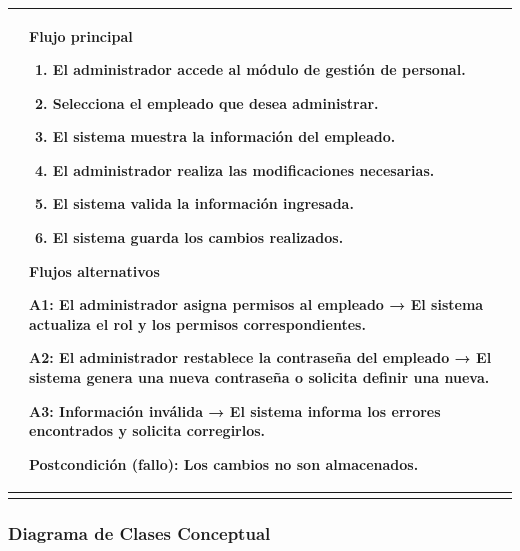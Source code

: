 \documentclass[
]{article}
\newcounter{none} %
\begin{document}
{\def\LTcaptype{none} %
\begin{longtable}[]{@{}
  >{\raggedright\arraybackslash}p{}
  >{\raggedright\arraybackslash}p{}@{}}
\toprule\noalign{}
\begin{minipage}[b]{\linewidth}\raggedright
\end{minipage} & \begin{minipage}[b]{\linewidth}\raggedright
\textbf{Flujo principal}

\begin{enumerate}
\def\labelenumi{\arabic{enumi}.}
\item
  El administrador accede al módulo de gestión de personal.
\item
  Selecciona el empleado que desea administrar.
\item
  El sistema muestra la información del empleado.
\item
  El administrador realiza las modificaciones necesarias.
\item
  El sistema valida la información ingresada.
\item
  El sistema guarda los cambios realizados.
\end{enumerate}

\textbf{Flujos alternativos}

A1: El administrador asigna permisos al empleado → El sistema actualiza
el rol y los permisos correspondientes.

A2: El administrador restablece la contraseña del empleado → El sistema
genera una nueva contraseña o solicita definir una nueva.

A3: Información inválida → El sistema informa los errores encontrados y
solicita corregirlos.

\textbf{Postcondición (fallo):} Los cambios no son almacenados.
\end{minipage} \\
\midrule\noalign{}
\endhead
\bottomrule\noalign{}
\endlastfoot
\end{longtable}
}

\subsubsection{Diagrama de Clases
Conceptual}\label{diagrama-de-clases-conceptual}
\end{document}
